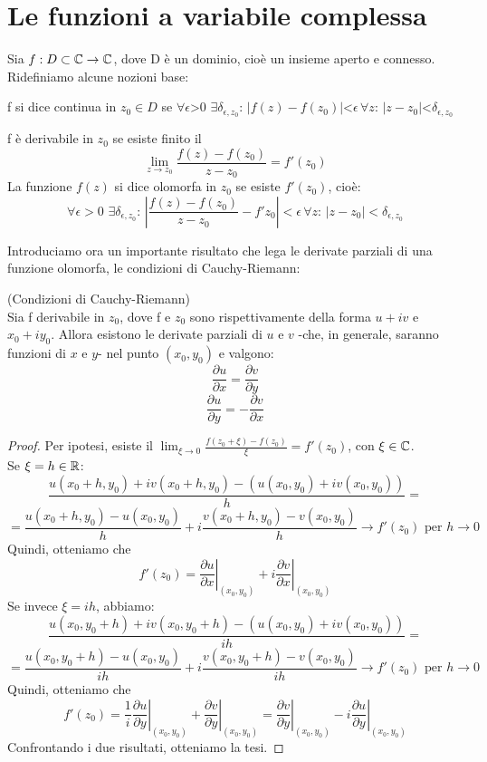 \chapter{Le funzioni a variabile complessa}

Sia $f:D\subset \mathbb{C} \to \mathbb{C}$, dove D è un dominio, cioè un insieme aperto e connesso. Ridefiniamo alcune nozioni base:
\begin{definizione}
f si dice continua in $z_0 \in D$ se $\forall \epsilon$>0 $\exists \delta_{\epsilon , z_0} : \, |f(z)-f(z_0)|$<$\epsilon \, \forall z: \, |z-z_0|$<$ \delta_{\epsilon , z_0} $
\end{definizione}
\begin{definizione}
f è derivabile in $z_0$ se esiste finito il
$$\lim_{z \to z_0} {\frac{f(z)-f(z_0)}{z-z_0} =f'(z_0)}$$
La funzione $f(z)$ si dice olomorfa in $z_0$ se esiste $f'(z_0)$, cioè:
 $$\forall \epsilon>0 \, \, \exists \delta_{\epsilon , z_0} : \, \left|\frac{f(z)-f(z_0)}{z-z_0} - f'{z_0}\right|< \epsilon \, \forall z: \, |z-z_0|<\delta_{\epsilon , z_0} $$
\end{definizione}

Introduciamo ora un importante risultato che lega le derivate parziali di una funzione olomorfa, le condizioni di Cauchy-Riemann:
\begin{teorema}(Condizioni di Cauchy-Riemann)\\
Sia f derivabile in $z_0$, dove f e $z_0$ sono rispettivamente della forma $u+iv$ e $x_0+iy_0$. Allora esistono le derivate parziali di $u$ e $v$ -che, in generale, saranno  funzioni di $x$ e $y$- nel punto $(x_0,y_0)$ e valgono:
$$\frac{\partial u}{\partial x}=\frac{\partial v}{\partial y}$$
$$\frac{\partial u}{\partial y}=-\frac{\partial v}{\partial x}$$
\end{teorema}


\begin{proof}
Per ipotesi, esiste il $\lim_{\xi \to 0} \frac{f(z_0+ \xi)-f(z_0)}{\xi} =f'(z_0)$, con $\xi \in \mathbb{C}$. \\Se $\xi=h \in \mathbb{R}$:
$$\frac{u(x_0 +h,y_0)+iv(x_0 +h,y_0)- (u(x_0,y_0)+iv(x_0 ,y_0)) }{h}=$$
$$=\frac{u(x_0 +h,y_0)-u(x_0,y_0)}{h} +i\frac{v(x_0+h,y_0)-v(x_0 ,y_0)}{h} \to f'(z_0) \text{ per } h \to 0$$
Quindi, otteniamo che 
$$\left. f'(z_0)=\frac{\partial u}{\partial x} \right|_{(x_0,y_0)} +i  \left. \frac{\partial v}{\partial x} \right|_{(x_0,y_0)}$$
Se invece $\xi=ih$, abbiamo:
$$\frac{u(x_0,y_0+h)+iv(x_0,y_0+h)-(u(x_0,y_0)+iv(x_0 ,y_0))}{ih}=$$
$$=\frac{u(x_0,y_0+h)-u(x_0,y_0)}{ih}+i\frac{v(x_0,y_0+h)-v(x_0 ,y_0)}{ih} \to f'(z_0) \text{ per } h \to 0$$
Quindi, otteniamo che 
$$f'(z_0)=\left. \frac{1}{i} \frac{\partial u}{\partial y} \right|_{(x_0,y_0)} +\left. \frac{\partial v}{\partial y} \right|_{(x_0,y_0)}=\left. \frac{\partial v}{\partial y} \right|_{(x_0,y_0)}-i \left. \frac{\partial u}{\partial y} \right|_{(x_0,y_0)}$$
Confrontando i due risultati, otteniamo la tesi.

\end{proof}

